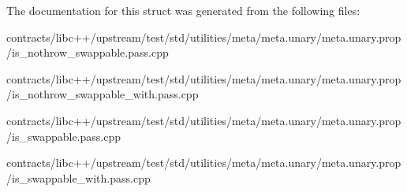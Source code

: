 The documentation for this struct was generated from the following files\+:\begin{DoxyCompactItemize}
\item 
contracts/libc++/upstream/test/std/utilities/meta/meta.\+unary/meta.\+unary.\+prop/is\+\_\+nothrow\+\_\+swappable.\+pass.\+cpp\item 
contracts/libc++/upstream/test/std/utilities/meta/meta.\+unary/meta.\+unary.\+prop/is\+\_\+nothrow\+\_\+swappable\+\_\+with.\+pass.\+cpp\item 
contracts/libc++/upstream/test/std/utilities/meta/meta.\+unary/meta.\+unary.\+prop/is\+\_\+swappable.\+pass.\+cpp\item 
contracts/libc++/upstream/test/std/utilities/meta/meta.\+unary/meta.\+unary.\+prop/is\+\_\+swappable\+\_\+with.\+pass.\+cpp\end{DoxyCompactItemize}
